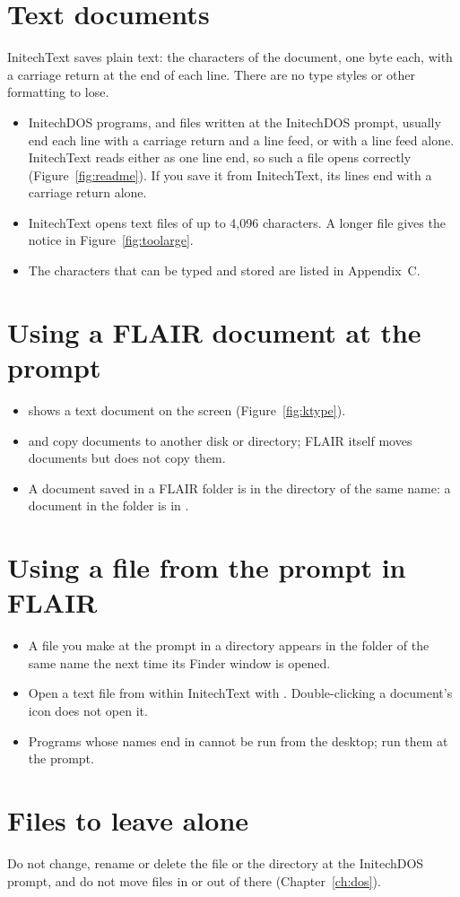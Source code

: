 \section{Text documents}
InitechText saves plain text: the characters of the document, one byte
each, with a carriage return at the end of each line.  There are no type
styles or other formatting to lose.
\begin{itemize}
\item InitechDOS programs, and files written at the InitechDOS prompt,
  usually end each line with a carriage return and a line feed, or with a
  line feed alone.  InitechText reads either as one line end, so such a
  file opens correctly (Figure~\ref{fig:readme}).  If you save it from
  InitechText, its lines end with a carriage return alone.
\item InitechText opens text files of up to 4,096 characters.  A longer
  file gives the notice in Figure~\ref{fig:toolarge}.
\item The characters that can be typed and stored are listed in
  Appendix~C.
\end{itemize}

\section{Using a FLAIR document at the prompt}
\begin{itemize}
\item {} shows a text document on the screen
  (Figure~\ref{fig:ktype}).
\item {} and  copy documents to another disk or
  directory; FLAIR itself moves documents but does not copy them.
\item A document saved in a FLAIR folder is in the directory of the same
  name: a document in the  folder is in .
\end{itemize}

\section{Using a file from the prompt in FLAIR}
\begin{itemize}
\item A file you make at the prompt in a directory appears in the folder of
  the same name the next time its Finder window is opened.
\item Open a text file from within InitechText with .
  Double-clicking a document's icon does not open it.
\item Programs whose names end in  cannot be run from the
  desktop; run them at the prompt.
\end{itemize}

\section{Files to leave alone}
Do not change, rename or delete the file  or the
 directory at the InitechDOS prompt, and do not move files in or
out of  there (Chapter~\ref{ch:dos}).
